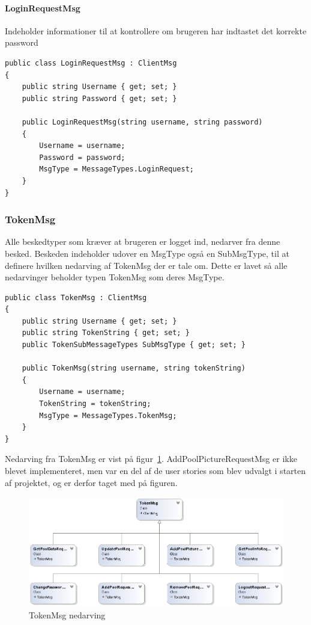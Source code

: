 \paragraph{LoginRequestMsg}
Indeholder informationer til at kontrollere om brugeren har indtastet det korrekte password
\begin{lstlisting}[caption=LoginRequestMsg, label=code:LoginRequestMsg]
public class LoginRequestMsg : ClientMsg
{
	public string Username { get; set; }
	public string Password { get; set; }
	
	public LoginRequestMsg(string username, string password)
	{
		Username = username;
		Password = password;
		MsgType = MessageTypes.LoginRequest;
	}
}
\end{lstlisting}

\subsubsection{TokenMsg}
Alle beskedtyper som kræver at brugeren er logget ind, nedarver fra denne besked. Beskeden indeholder udover en MsgType også en SubMsgType, til at definere hvilken nedarving af TokenMsg der er tale om. Dette er lavet så alle nedarvinger beholder typen TokenMsg som deres MsgType.
\begin{lstlisting}[caption=TokenMsg, label=code:TokenMsg]
public class TokenMsg : ClientMsg
{
	public string Username { get; set; }
	public string TokenString { get; set; }
	public TokenSubMessageTypes SubMsgType { get; set; }
	
	public TokenMsg(string username, string tokenString)
	{
		Username = username;
		TokenString = tokenString;
		MsgType = MessageTypes.TokenMsg;
	}
}
\end{lstlisting}

Nedarving fra TokenMsg er vist på figur~\ref{fig:TokenMsgUML}. AddPoolPictureRequestMsg er ikke blevet implementeret, men var en del af de user stories som blev udvalgt i starten af projektet, og er derfor taget med på figuren.
\begin{figure}
	\centering
	\includegraphics[width=0.7\linewidth]{figs/connection/TokenMsgUML.png}
	\caption{TokenMsg nedarving}
	\label{fig:TokenMsgUML}
\end{figure}

